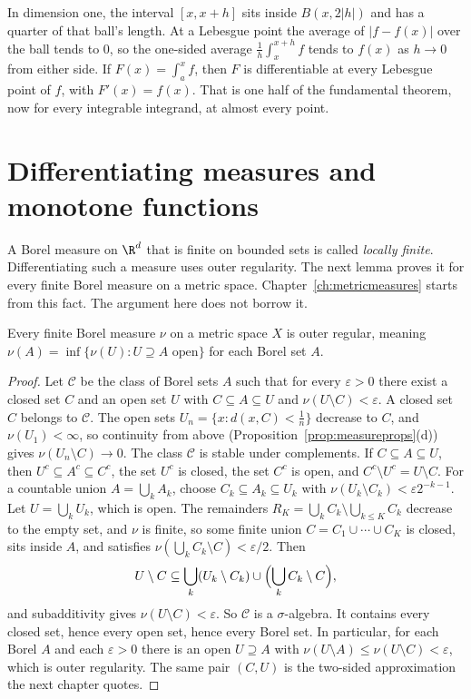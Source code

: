 In dimension one, the interval $[x,x+h]$ sits inside $B(x,2|h|)$ and has a quarter of that ball's length. At a Lebesgue point the average of $|f-f(x)|$ over the ball tends to $0$, so the one-sided average $\frac1h\int_x^{x+h}f$ tends to $f(x)$ as $h\to0$ from either side. If $F(x)=\int_a^xf$, then $F$ is differentiable at every Lebesgue point of $f$, with $F'(x)=f(x)$. That is one half of the fundamental theorem, now for every integrable integrand, at almost every point.

\section{Differentiating measures and monotone functions}

A Borel measure on $\R^d$ that is finite on bounded sets is called \emph{locally finite}. Differentiating such a measure uses outer regularity. The next lemma proves it for every finite Borel measure on a metric space. Chapter~\ref{ch:metricmeasures} starts from this fact. The argument here does not borrow it.

\begin{lemma}\label{lem:outerreg}
Every finite Borel measure $\nu$ on a metric space $X$ is outer regular, meaning $\nu(A)=\inf\{\nu(U):U\supseteq A\text{ open}\}$ for each Borel set $A$.
\end{lemma}
\begin{proof}
Let $\mathcal C$ be the class of Borel sets $A$ such that for every $\varepsilon>0$ there exist a closed set $C$ and an open set $U$ with $C\subseteq A\subseteq U$ and $\nu(U\setminus C)<\varepsilon$. A closed set $C$ belongs to $\mathcal C$. The open sets $U_n=\{x:d(x,C)<\frac1n\}$ decrease to $C$, and $\nu(U_1)<\infty$, so continuity from above (Proposition~\ref{prop:measureprops}(d)) gives $\nu(U_n\setminus C)\to0$. The class $\mathcal C$ is stable under complements. If $C\subseteq A\subseteq U$, then $U^c\subseteq A^c\subseteq C^c$, the set $U^c$ is closed, the set $C^c$ is open, and $C^c\setminus U^c=U\setminus C$. For a countable union $A=\bigcup_kA_k$, choose $C_k\subseteq A_k\subseteq U_k$ with $\nu(U_k\setminus C_k)<\varepsilon2^{-k-1}$. Let $U=\bigcup_kU_k$, which is open. The remainders $R_K=\bigcup_kC_k\setminus\bigcup_{k\le K}C_k$ decrease to the empty set, and $\nu$ is finite, so some finite union $C=C_1\cup\cdots\cup C_K$ is closed, sits inside $A$, and satisfies $\nu(\bigcup_kC_k\setminus C)<\varepsilon/2$. Then
\[
U\setminus C\subseteq\bigcup_k(U_k\setminus C_k)\cup\Bigl(\bigcup_kC_k\setminus C\Bigr),
\]
and subadditivity gives $\nu(U\setminus C)<\varepsilon$. So $\mathcal C$ is a $\sigma$-algebra. It contains every closed set, hence every open set, hence every Borel set. In particular, for each Borel $A$ and each $\varepsilon>0$ there is an open $U\supseteq A$ with $\nu(U\setminus A)\le\nu(U\setminus C)<\varepsilon$, which is outer regularity. The same pair $(C,U)$ is the two-sided approximation the next chapter quotes.
\end{proof}

